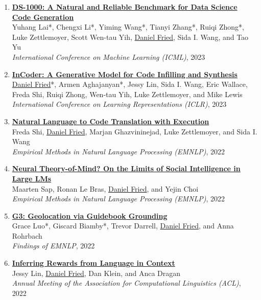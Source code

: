 \begin{enumerate}[leftmargin=-1mm,partopsep=0pt]
\item \href{https://arxiv.org/abs/2211.11501}{\textbf{DS-1000: A Natural and Reliable Benchmark for Data Science Code Generation}} \\
  Yuhang Lai*, Chengxi Li*, Yiming Wang*, Tianyi Zhang*, Ruiqi Zhong*, Luke Zettlemoyer, Scott Wen-tau Yih, \underline{Daniel Fried}, Sida I. Wang, and Tao Yu\\
  \emph{International Conference on Machine Learning (ICML)}, 2023

\item \href{https://arxiv.org/abs/2204.05999}{\textbf{InCoder: A Generative Model for Code Infilling and Synthesis}} \\
  \underline{Daniel Fried}*, Armen Aghajanyan*, Jessy Lin, Sida I. Wang, Eric Wallace, Freda Shi, Ruiqi Zhong, Wen-tau Yih, Luke Zettlemoyer, and Mike Lewis\\
  \emph{International Conference on Learning Representations (ICLR)}, 2023

\item \href{https://arxiv.org/abs/2204.11454}{\textbf{Natural Language to Code Translation with Execution}} \\
  Freda Shi, \underline{Daniel Fried}, Marjan Ghazvininejad, Luke Zettlemoyer, and Sida I. Wang\\
  \emph{Empirical Methods in Natural Language Processing (EMNLP)}, 2022

\item \href{https://arxiv.org/abs/2210.13312}{\textbf{Neural Theory-of-Mind? On the Limits of Social Intelligence in Large LMs}} \\
  Maarten Sap, Ronan Le Bras, \underline{Daniel Fried}, and Yejin Choi \\
  \emph{Empirical Methods in Natural Language Processing (EMNLP)}, 2022

\item \href{https://arxiv.org/abs/2211.15521}{\textbf{G3: Geolocation via Guidebook Grounding}} \\
  Grace Luo*, Giscard Biamby*, Trevor Darrell, \underline{Daniel Fried}, and Anna Rohrbach\\
  \emph{Findings of EMNLP}, 2022

\item \href{https://arxiv.org/abs/2204.02515}{\textbf{Inferring Rewards from Language in Context}} \\
  Jessy Lin, \underline{Daniel Fried}, Dan Klein, and Anca Dragan\\
  \emph{Annual Meeting of the Association for Computational Linguistics (ACL)}, 2022


\end{enumerate}
